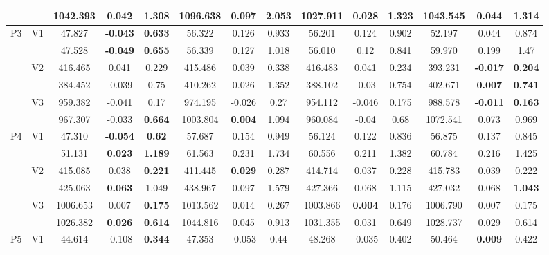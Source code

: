 \documentclass[12pt,a4paper]{article}
\begin{document}
\begin{sidewaystable}[ht]
{\begin{tabular}{cc|ccc|ccc|ccc|ccc|}
   &  & 1042.393 & 0.042 & \textbf{1.308} & 1096.638 & 0.097 & 2.053 & 1027.911 & \textbf{0.028} & 1.323 & 1043.545 & 0.044 & 1.314 \\ 
   \hline \hline\multirow{6}{*}{P3} & \multirow{2}{*}{V1} & 47.827 & \textbf{-0.043} & \textbf{0.633} & 56.322 & 0.126 & 0.933 & 56.201 & 0.124 & 0.902 & 52.197 & 0.044 & 0.874 \\ 
   &  & 47.528 & \textbf{-0.049} & \textbf{0.655} & 56.339 & 0.127 & 1.018 & 56.010 & 0.12 & 0.841 & 59.970 & 0.199 & 1.47 \\ 
   & \multirow{2}{*}{V2} & 416.465 & 0.041 & 0.229 & 415.486 & 0.039 & 0.338 & 416.483 & 0.041 & 0.234 & 393.231 & \textbf{-0.017} & \textbf{0.204} \\ 
   &  & 384.452 & -0.039 & 0.75 & 410.262 & 0.026 & 1.352 & 388.102 & -0.03 & 0.754 & 402.671 & \textbf{0.007} & \textbf{0.741} \\ 
   & \multirow{2}{*}{V3} & 959.382 & -0.041 & 0.17 & 974.195 & -0.026 & 0.27 & 954.112 & -0.046 & 0.175 & 988.578 & \textbf{-0.011} & \textbf{0.163} \\ 
   &  & 967.307 & -0.033 & \textbf{0.664} & 1003.804 & \textbf{0.004} & 1.094 & 960.084 & -0.04 & 0.68 & 1072.541 & 0.073 & 0.969 \\ 
   \hline \hline\multirow{6}{*}{P4} & \multirow{2}{*}{V1} & 47.310 & \textbf{-0.054} & \textbf{0.62} & 57.687 & 0.154 & 0.949 & 56.124 & 0.122 & 0.836 & 56.875 & 0.137 & 0.845 \\ 
   &  & 51.131 & \textbf{0.023} & \textbf{1.189} & 61.563 & 0.231 & 1.734 & 60.556 & 0.211 & 1.382 & 60.784 & 0.216 & 1.425 \\ 
   & \multirow{2}{*}{V2} & 415.085 & 0.038 & \textbf{0.221} & 411.445 & \textbf{0.029} & 0.287 & 414.714 & 0.037 & 0.228 & 415.783 & 0.039 & 0.222 \\ 
   &  & 425.063 & \textbf{0.063} & 1.049 & 438.967 & 0.097 & 1.579 & 427.366 & 0.068 & 1.115 & 427.032 & 0.068 & \textbf{1.043} \\ 
   & \multirow{2}{*}{V3} & 1006.653 & 0.007 & \textbf{0.175} & 1013.562 & 0.014 & 0.267 & 1003.866 & \textbf{0.004} & 0.176 & 1006.790 & 0.007 & 0.175 \\ 
   &  & 1026.382 & \textbf{0.026} & \textbf{0.614} & 1044.816 & 0.045 & 0.913 & 1031.355 & 0.031 & 0.649 & 1028.737 & 0.029 & 0.614 \\ 
   \hline \hline\multirow{6}{*}{P5} & \multirow{2}{*}{V1} & 44.614 & -0.108 & \textbf{0.344} & 47.353 & -0.053 & 0.44 & 48.268 & -0.035 & 0.402 & 50.464 & \textbf{0.009} & 0.422 \\ 

\end{tabular}}
\end{sidewaystable}
\end{document}
